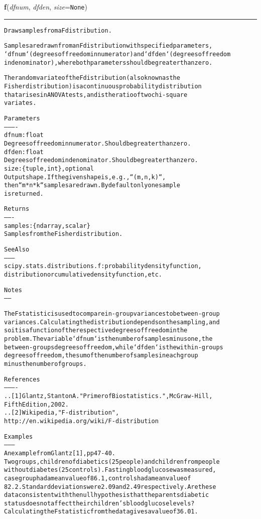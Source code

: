 \hspace{.8\funcindent}\begin{boxedminipage}{\funcwidth}

    \raggedright \textbf{f}(\textit{dfnum}, \textit{dfden}, \textit{size}={\tt None})

    \vspace{-1.5ex}

    \rule{\textwidth}{0.5\fboxrule}
\setlength{\parskip}{2ex}
\begin{alltt}
Draw samples from a F distribution.

Samples are drawn from an F distribution with specified parameters,
`dfnum` (degrees of freedom in numerator) and `dfden` (degrees of freedom
in denominator), where both parameters should be greater than zero.

The random variate of the F distribution (also known as the
Fisher distribution) is a continuous probability distribution
that arises in ANOVA tests, and is the ratio of two chi-square
variates.

Parameters
----------
dfnum : float
    Degrees of freedom in numerator. Should be greater than zero.
dfden : float
    Degrees of freedom in denominator. Should be greater than zero.
size : \{tuple, int\}, optional
    Output shape.  If the given shape is, e.g., ``(m, n, k)``,
    then ``m * n * k`` samples are drawn. By default only one sample
    is returned.

Returns
-------
samples : \{ndarray, scalar\}
    Samples from the Fisher distribution.

See Also
--------
scipy.stats.distributions.f : probability density function,
    distribution or cumulative density function, etc.

Notes
-----

The F statistic is used to compare in-group variances to between-group
variances. Calculating the distribution depends on the sampling, and
so it is a function of the respective degrees of freedom in the
problem.  The variable `dfnum` is the number of samples minus one, the
between-groups degrees of freedom, while `dfden` is the within-groups
degrees of freedom, the sum of the number of samples in each group
minus the number of groups.

References
----------
.. [1] Glantz, Stanton A. "Primer of Biostatistics.", McGraw-Hill,
       Fifth Edition, 2002.
.. [2] Wikipedia, "F-distribution",
       http://en.wikipedia.org/wiki/F-distribution

Examples
--------
An example from Glantz[1], pp 47-40.
Two groups, children of diabetics (25 people) and children from people
without diabetes (25 controls). Fasting blood glucose was measured,
case group had a mean value of 86.1, controls had a mean value of
82.2. Standard deviations were 2.09 and 2.49 respectively. Are these
data consistent with the null hypothesis that the parents diabetic
status does not affect their children's blood glucose levels?
Calculating the F statistic from the data gives a value of 36.01.


\end{alltt}
\end{boxedminipage}
